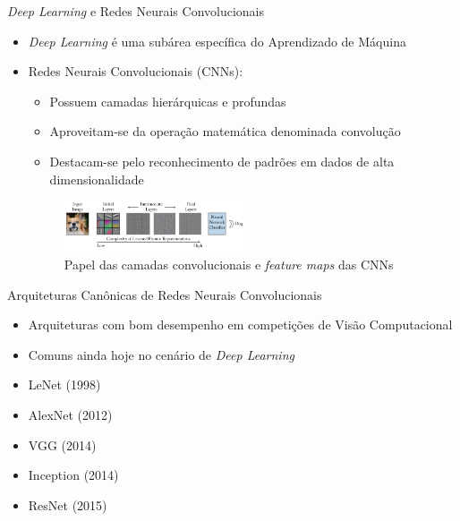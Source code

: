 \begin{frame}{\emph{Deep Learning} e Redes Neurais Convolucionais}
  \baselineskip
\begin{itemize}
	\item \emph{Deep Learning} é uma subárea específica do Aprendizado de Máquina
	\bigskip
	\item Redes Neurais Convolucionais (CNNs):
    \begin{itemize}
      \item Possuem camadas \alert{hierárquicas} e \alert{profundas}
      \item Aproveitam-se da operação matemática denominada \alert{convolução}
      \item Destacam-se pelo reconhecimento de padrões em dados de alta dimensionalidade
    \end{itemize}

    \begin{figure}
    	\caption{Papel das camadas convolucionais e \emph{feature maps} das CNNs}
    	\label{fig:camadas-convolucionais}
    	\includegraphics[width=0.5\textwidth]{./img/camadas-convolucionais}
    \end{figure}

\end{itemize}
\end{frame}


\begin{frame}{\Large{Arquiteturas Canônicas de Redes Neurais Convolucionais}}
\begin{itemize}
	\item Arquiteturas com bom desempenho em competições de \alert{Visão Computacional}
	\item Comuns ainda hoje no cenário de \emph{Deep Learning}
	\bigskip
	\item LeNet (1998)
	\item AlexNet (2012)
	\item VGG (2014)
	\item Inception (2014)
	\item ResNet (2015)
\end{itemize}

\end{frame}
